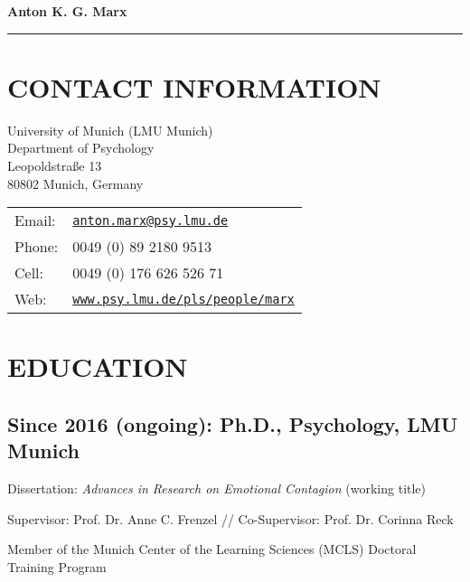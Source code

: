 \documentclass[letterpaper]{article}
\def\name{Anton K. G. Marx} %
\renewenvironment{itemize}{ %
  \begin{list}{}{ %
    \setlength{\leftmargin}{2.5em} %
  }
}{
  \end{list}
}
\begin{document}
\begin{center} %

{\Huge \bf \name}

\end{center}

\noindent\rule{\textwidth}{0.5pt} %

\section*{CONTACT INFORMATION}

\vspace{0in}



\begin{minipage}{0.45\linewidth}
  University of Munich (LMU Munich) \\
  Department of Psychology \\
  Leopoldstraße 13 \\
  80802 Munich, Germany
\end{minipage}
\begin{minipage}{1.45\linewidth}
  \begin{tabular}{ll}
    Email: & \href{mailto:anton.marx@psy.lmu.de}{\tt anton.marx@psy.lmu.de} \\
    Phone: & 0049 (0) 89  2180 9513 \\
    Cell: &  0049 (0) 176 626 526 71 \\
    Web: & \href{https://www.psy.lmu.de/pls/people/marx/}{\tt www.psy.lmu.de/pls/people/marx} \\
  \end{tabular}
\end{minipage}



\section*{EDUCATION}

\subsection*{Since 2016 (ongoing): Ph.D., Psychology, LMU Munich}
\begin{itemize}
  \item Dissertation: {\it Advances in Research on Emotional Contagion} (working title)
    \item Supervisor: Prof. Dr. Anne C. Frenzel // Co-Supervisor: Prof. Dr. Corinna Reck
    \item Member of the Munich Center of the Learning Sciences (MCLS) Doctoral Training Program
  \end{itemize}
  
\end{document}
